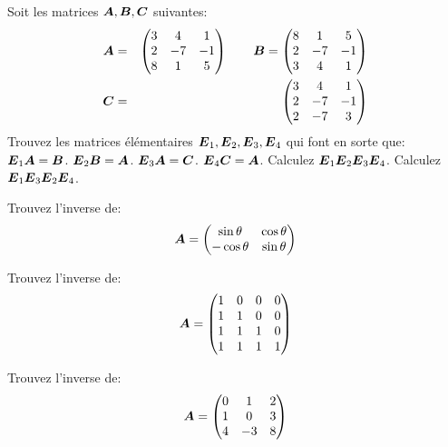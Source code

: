 \begin{TwoCol}
   \begin{exercice}
   Soit les matrices $\boldsymbol{A}, \boldsymbol{B}, \boldsymbol{C}$ suivantes:
   \begin{eqnarray*}
   \boldsymbol{A} &=& \begin{pmatrix}
   3 & 4 & 1\\
   2 & -7 & -1 \\
   8 & 1 & 5
   \end{pmatrix}
   \qquad
   \boldsymbol{B} = \begin{pmatrix}
   8 & 1 & 5 \\
   2 & -7 & -1 \\
   3 & 4 & 1
   \end{pmatrix} \\
   \boldsymbol{C} &=& \begin{pmatrix}
   3 & 4 & 1 \\
   2 & -7 & -1 \\
   2 & -7 & 3
\end{pmatrix}    
   \end{eqnarray*}
   Trouvez les matrices élémentaires $\boldsymbol{E}_1, \boldsymbol{E}_2, \boldsymbol{E}_3, \boldsymbol{E}_4$ qui font en sorte que:
    $\boldsymbol{E}_1 \boldsymbol{A} = \boldsymbol{B}$.
    $\boldsymbol{E}_2 \boldsymbol{B} = \boldsymbol{A}$.
    $\boldsymbol{E}_3 \boldsymbol{A} = \boldsymbol{C}$.
    $\boldsymbol{E}_4 \boldsymbol{C} = \boldsymbol{A}$.
    Calculez $\boldsymbol{E}_1\boldsymbol{E}_2\boldsymbol{E}_3\boldsymbol{E}_4$.
    Calculez $\boldsymbol{E}_1\boldsymbol{E}_3\boldsymbol{E}_2\boldsymbol{E}_4$.
   \end{exercice}
   
   \begin{exercice}
   Trouvez l'inverse de:
   \[
   \boldsymbol{A} = 
   \begin{pmatrix}
   \sin\theta & \cos\theta \\
   -\cos\theta & \sin\theta
   \end{pmatrix}
   \]
   \end{exercice}

   \begin{exercice}
   Trouvez l'inverse de:
   \[
   \boldsymbol{A} = 
   \begin{pmatrix}
   1 & 0 & 0 & 0 \\
   1 & 1 & 0 & 0 \\
   1 & 1 & 1 & 0 \\
   1 & 1 & 1 & 1
   \end{pmatrix}
   \]
   \end{exercice}
   
      \begin{exercice}
   Trouvez l'inverse de:
   \[
   \boldsymbol{A} = 
   \begin{pmatrix}
   0 & 1 & 2\\
   1 & 0 & 3\\
   4 & -3 & 8
   \end{pmatrix}
   \]
   \end{exercice}
   

\end{TwoCol}
